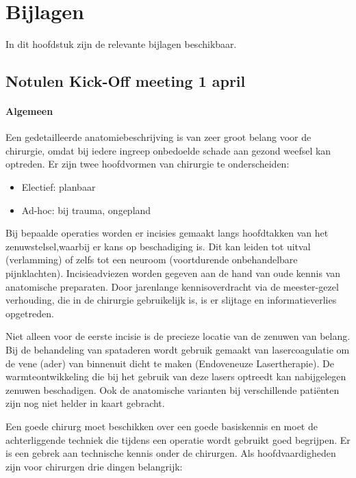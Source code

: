 \section{Bijlagen}

In dit hoofdstuk zijn de relevante bijlagen beschikbaar. 

\subsection{Notulen Kick-Off meeting 1 april}
\label{notulen}
\paragraph{Algemeen}

Een gedetailleerde anatomiebeschrijving is van zeer groot belang voor de chirurgie, omdat bij iedere ingreep onbedoelde schade aan gezond weefsel kan optreden. Er zijn twee hoofdvormen van chirurgie te onderscheiden: 

\begin{itemize}
	\item Electief: planbaar 
	\item Ad-hoc: bij trauma, ongepland 
\end{itemize}

Bij bepaalde operaties worden er incisies gemaakt langs hoofdtakken van het zenuwstelsel,waarbij er kans op beschadiging is. Dit kan leiden tot uitval (verlamming) of zelfs tot een neuroom (voortdurende onbehandelbare pijnklachten). Incisieadviezen worden gegeven aan de hand van oude kennis van anatomische preparaten. Door jarenlange kennisoverdracht via de meester-gezel verhouding, die in de chirurgie gebruikelijk is, is er slijtage  en informatieverlies opgetreden. 

Niet alleen voor de eerste incisie is de precieze locatie van de zenuwen van belang. Bij de behandeling van spataderen wordt gebruik gemaakt van lasercoagulatie om de vene (ader) van binnenuit dicht te maken (Endoveneuze Lasertherapie). De warmteontwikkeling die bij het gebruik van deze lasers optreedt kan nabijgelegen zenuwen beschadigen. Ook de anatomische varianten bij verschillende pati\"enten zijn nog niet helder in kaart gebracht. 

Een goede chirurg moet beschikken over een goede basiskennis en moet de achterliggende techniek die tijdens een operatie wordt gebruikt goed begrijpen.
Er is een gebrek aan technische kennis onder de chirurgen.
Als hoofdvaardigheden zijn voor chirurgen drie dingen belangrijk:

